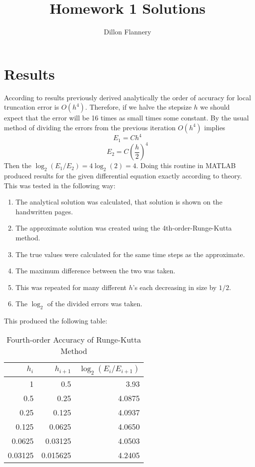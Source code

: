 \documentclass[]{article}
\title{Homework 1 Solutions}
\author{Dillon Flannery}
\begin{document}
\maketitle

\section{Results} According to results previously derived analytically the order of accuracy for local truncation error is $ O(h^4) $. Therefore, if we halve the stepsize $ h $ we should expect that the error will be 16 times as small times some constant. By the usual method of dividing the errors from the previous iteration $ O(h^4) $ implies
\[
E_1 = Ch^4
\]
\[
E_2 = C(\frac{h}{2})^4
\]
Then the $ \log_2(E_1/E_2) = 4 \log_2(2) = 4$. Doing this routine in MATLAB produced results for the given differential equation exactly according to theory. This was tested in the following way:
\begin{enumerate}
	\item The analytical solution was calculated, that solution is shown on the handwritten pages.
	\item The approximate solution was created using the 4th-order-Runge-Kutta method.
	\item The true values were calculated for the same time steps as the approximate.
	\item The maximum difference between the two was taken.
	\item This was repeated for many different $ h $'s each decreasing in size by $ 1/2 $.
	\item The $ \log_2  $ of the divided errors was taken.
\end{enumerate}
This produced the following table:
\begin{table}[H]
	\centering
	\caption{Fourth-order Accuracy of Runge-Kutta Method}
	\begin{tabular}{rrr}
		$ h_i $ & $ h_{i+1} $ & $ \log_2(E_i/E_{i+1}) $\\
		\hline 
		\hline 
		1 & 0.5 & 3.93\\
		0.5 & 0.25 & 4.0875\\
		0.25 & 0.125 & 4.0937\\
		0.125 & 0.0625 & 4.0650\\ 
		0.0625 &  0.03125 & 4.0503 \\
		0.03125 & 0.015625 &  4.2405\\
		\hline
	\end{tabular}
\end{table}
\end{document}
